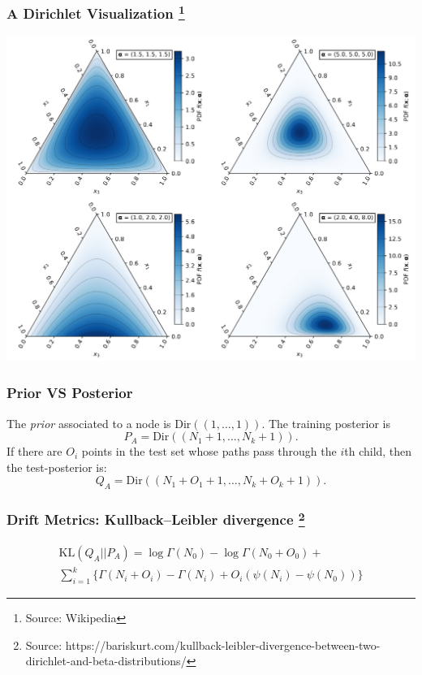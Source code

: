 \documentclass{beamer}
\begin{document}
\begin{frame}
    \frametitle{A Dirichlet Visualization \footnote{Source: Wikipedia}}
    \begin{center}
        \includegraphics[scale=0.22]{wiki_dirichlet.png}
        
    \end{center}

\end{frame}

\begin{frame}
    \frametitle{Prior VS Posterior}
    The \emph{prior} associated to a node is $\text{Dir}((1, \dots, 1))$. The training posterior is 
    $$P_A = \text{Dir}((N_1 + 1, \dots, N_k + 1)).$$ If there are $O_i$ points in the test set whose paths pass 
    through the $i$th child, then the test-posterior is: $$Q_A = \text{Dir}((N_1 + O_1 + 1, \dots, N_k + O_k + 1)).$$
\end{frame}

\begin{frame}
    \frametitle{Drift Metrics: Kullback–Leibler divergence \footnote{Source: https://bariskurt.com/kullback-leibler-divergence-between-two-dirichlet-and-beta-distributions/}}
    \begin{multline}
        \text{KL}(Q_A||P_A) = \log \Gamma(N_0) - \log \Gamma(N_0 + O_0) + \\ \sum_{i=1}^k \lbrace \Gamma(N_i + O_i) - \Gamma(N_i) + O_i (\psi(N_i) - \psi(N_0)) \rbrace
    \end{multline}
\end{frame}
\end{document}
